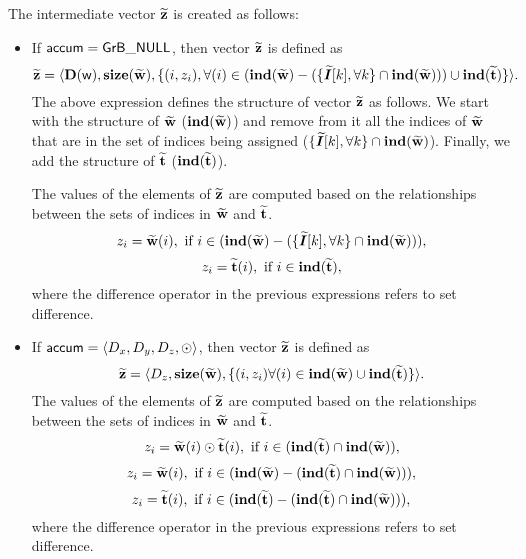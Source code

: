 The intermediate vector ${\bf \widetilde{z}}$ is created as follows:
\begin{itemize}
    \item If ${\sf accum} = {\sf GrB\_NULL}$, then vector
    ${\bf \widetilde{z}}$ is defined as 
        \[ 
        {\bf \widetilde{z}} =
		\langle \bold{D}({\sf w}), \bold{size}({\bf \widetilde{w}}), 
		\{(i,z_{i}), \forall (i) \in (\bold{ind}({\bf \widetilde{w}})-(\{\bm{\widetilde{I}}[k],\forall k\} \cap \bold{ind}({\bf \widetilde{w}}))) \cup 
        \bold{ind}({\bf \widetilde{t}}) \} \rangle.\]
    The above expression defines the structure of vector ${\bf \widetilde{z}}$ as follows.
		We start with the structure of ${\bf \widetilde{w}}$ ($\bold{ind}({\bf \widetilde{w}})$) and remove from 
		it all the indices of ${\bf \widetilde{w}}$ that are
		in the set of indices being assigned ($\{\bm{\widetilde{I}}[k],\forall k\} \cap \bold{ind}({\bf \widetilde     {w}})$). Finally, we
		add the structure of ${\bf \widetilde{t}}$ ($\bold{ind}({\bf \widetilde{t}})$).

    The values of the elements of ${\bf \widetilde{z}}$ are computed based 
    on the relationships between the sets of indices in ${\bf \widetilde{w}}$ 
    and ${\bf \widetilde{t}}$.
\[
    z_{i} = {\bf \widetilde{w}}(i), \ \mbox{if}\  
    i \in  (\bold{ind}({\bf \widetilde{w}}) - (\{\bm{\widetilde{I}}[k],\forall k\} \cap \bold{ind}({\bf \widetilde{w}}))),
\]
\[
    z_{i} = \vector{\widetilde{t}}(i), \ \mbox{if}\  i \in  
    \bold{ind}(\vector{\widetilde{t}}),
\]
where the difference operator in the previous expressions refers to set difference.

    \item If ${\sf accum} = \langle D_x, D_y, D_z, \odot \rangle$, then vector 
    ${\bf \widetilde{z}}$ is defined as 
        \[ 
        {\bf \widetilde{z}} =
        \langle D_z, \bold{size}({\bf \widetilde{w}}), 
		\{(i,z_{i})  \forall (i) \in \bold{ind}({\bf \widetilde{w}}) \cup 
        \bold{ind}({\bf \widetilde{t}}) \} \rangle.\]
    The values of the elements of ${\bf \widetilde{z}}$ are computed based 
    on the relationships between the sets of indices in ${\bf \widetilde{w}}$ 
    and ${\bf \widetilde{t}}$.
\[
    z_{i} = {\bf \widetilde{w}}(i) \odot {\bf \widetilde{t}}(i), \ \mbox{if}\  
    i \in  (\bold{ind}({\bf \widetilde{t}}) \cap \bold{ind}({\bf \widetilde{w}})),
\]
\[
    z_{i} = {\bf \widetilde{w}}(i), \ \mbox{if}\  
    i \in  (\bold{ind}({\bf \widetilde{w}}) - (\bold{ind}({\bf \widetilde{t}})
    \cap \bold{ind}({\bf \widetilde{w}}))),
\]
\[
    z_{i} = \vector{\widetilde{t}}(i), \ \mbox{if}\  i \in  
    (\bold{ind}(\vector{\widetilde{t}}) - (\bold{ind}(\vector{\widetilde{t}}) 
    \cap \bold{ind}(\vector{\widetilde{w}}))),
\]
where the difference operator in the previous expressions refers to set difference.
\end{itemize}


